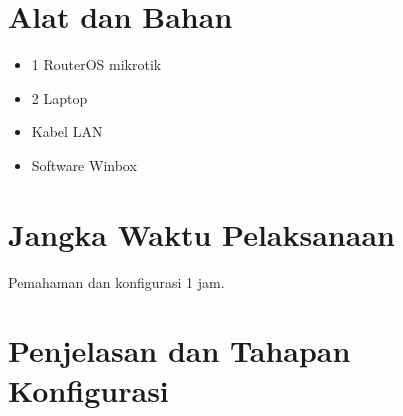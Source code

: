 \section{Alat dan Bahan}
\begin{itemize}[label=$\bullet$, itemsep=-1pt, leftmargin=*]
	\item 1 RouterOS mikrotik
	\item 2 Laptop
	\item Kabel LAN
	\item Software Winbox
\end{itemize}

\section{Jangka Waktu Pelaksanaan}
Pemahaman dan konfigurasi 1 jam.

\section{Penjelasan dan Tahapan Konfigurasi}

